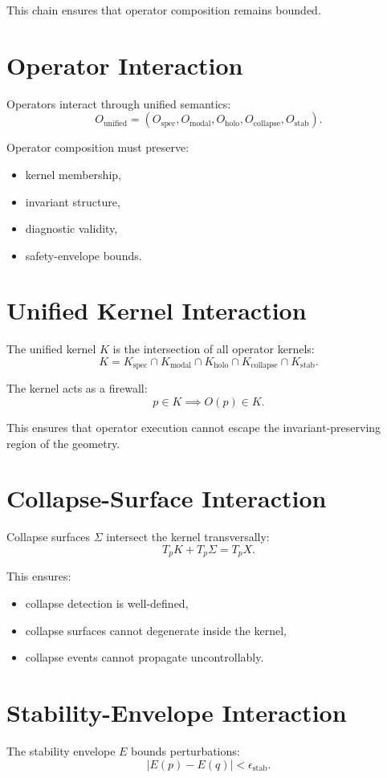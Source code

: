 \documentclass[11pt]{article}
\begin{document}
This chain ensures that operator composition remains bounded.

\section{Operator Interaction}
Operators interact through unified semantics:
\[
O_{\text{unified}} = 
(O_{\text{spec}}, O_{\text{modal}}, O_{\text{holo}},
 O_{\text{collapse}}, O_{\text{stab}}).
\]

Operator composition must preserve:
\begin{itemize}
  \item kernel membership,
  \item invariant structure,
  \item diagnostic validity,
  \item safety-envelope bounds.
\end{itemize}

\section{Unified Kernel Interaction}
The unified kernel $K$ is the intersection of all operator kernels:
\[
K = K_{\text{spec}} \cap K_{\text{modal}} \cap K_{\text{holo}} \cap
    K_{\text{collapse}} \cap K_{\text{stab}}.
\]

The kernel acts as a firewall:
\[
p \in K \implies O(p) \in K.
\]

This ensures that operator execution cannot escape the invariant-preserving
region of the geometry.

\section{Collapse-Surface Interaction}
Collapse surfaces $\Sigma$ intersect the kernel transversally:
\[
T_p K + T_p \Sigma = T_p X.
\]

This ensures:
\begin{itemize}
  \item collapse detection is well-defined,
  \item collapse surfaces cannot degenerate inside the kernel,
  \item collapse events cannot propagate uncontrollably.
\end{itemize}

\section{Stability-Envelope Interaction}
The stability envelope $E$ bounds perturbations:
\[
|E(p) - E(q)| < \epsilon_{\text{stab}}.
\]
\end{document}
